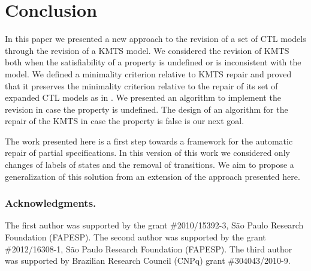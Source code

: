 \documentclass{llncs}
\begin{document}
\section{Conclusion}
\label{secCon}
In this paper we presented a new approach to the revision of a set of CTL models through the revision of a KMTS model. We considered the revision of KMTS both when the satisfiability of a property is undefined or is inconsistent with the model. We defined a minimality criterion relative to KMTS repair and proved that it preserves the minimality criterion relative to the repair of its set of expanded CTL models as in \cite{GW10}. We presented an algorithm to implement the revision in case the property is undefined. The design of an algorithm for the repair of the KMTS in case the property is false is our next goal. 

The work presented here is a first step towards a framework for the automatic repair of partial specifications. In this version of this work we considered only changes of labels of states and the removal of transitions. We aim to propose a generalization of this solution from an extension of the approach presented here.  

\vspace*{-.3cm}

\subsubsection*{Acknowledgments.} The first author was supported by the grant \#2010/15392-3, S\~{a}o Paulo Research Foundation (FAPESP). The second author was supported by the grant \#2012/16308-1, S\~{a}o Paulo Research Foundation (FAPESP). The third author was supported by Brazilian Research Council (CNPq) grant \#304043/2010-9.



\end{document}
